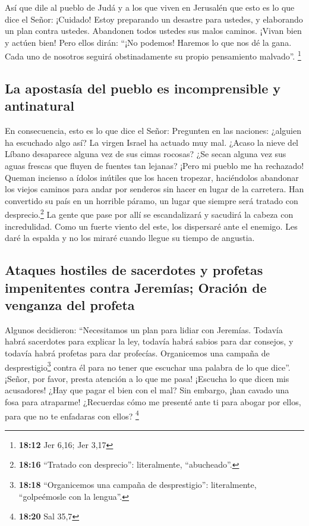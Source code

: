  Así que dile al pueblo de Judá y a los que viven en
Jerusalén que esto es lo que dice el Señor: ¡Cuidado! Estoy preparando
un desastre para ustedes, y elaborando un plan contra ustedes. Abandonen
todos ustedes sus malos caminos. ¡Vivan bien y actúen bien!
 Pero ellos dirán: ``¡No podemos! Haremos lo que nos dé
la gana. Cada uno de nosotros seguirá obstinadamente su propio
pensamiento malvado''. \footnote{\textbf{18:12} Jer 6,16; Jer 3,17}

\hypertarget{la-apostasuxeda-del-pueblo-es-incomprensible-y-antinatural}{%
\subsection{La apostasía del pueblo es incomprensible y
antinatural}\label{la-apostasuxeda-del-pueblo-es-incomprensible-y-antinatural}}

 En consecuencia, esto es lo que dice el Señor: Pregunten
en las naciones: ¿alguien ha escuchado algo así? La virgen Israel ha
actuado muy mal.  ¿Acaso la nieve del Líbano desaparece
alguna vez de sus cimas rocosas? ¿Se secan alguna vez sus aguas frescas
que fluyen de fuentes tan lejanas?  ¡Pero mi pueblo me ha
rechazado! Queman incienso a ídolos inútiles que los hacen tropezar,
haciéndolos abandonar los viejos caminos para andar por senderos sin
hacer en lugar de la carretera.  Han convertido su país
en un horrible páramo, un lugar que siempre será tratado con
desprecio.\footnote{\textbf{18:16} ``Tratado con desprecio'':
  literalmente, ``abucheado''.} La gente que pase por allí se
escandalizará y sacudirá la cabeza con incredulidad. 
Como un fuerte viento del este, los dispersaré ante el enemigo. Les daré
la espalda y no los miraré cuando llegue su tiempo de angustia.

\hypertarget{ataques-hostiles-de-sacerdotes-y-profetas-impenitentes-contra-jeremuxedas-oraciuxf3n-de-venganza-del-profeta}{%
\subsection{Ataques hostiles de sacerdotes y profetas impenitentes
contra Jeremías; Oración de venganza del
profeta}\label{ataques-hostiles-de-sacerdotes-y-profetas-impenitentes-contra-jeremuxedas-oraciuxf3n-de-venganza-del-profeta}}

 Algunos decidieron: ``Necesitamos un plan para lidiar
con Jeremías. Todavía habrá sacerdotes para explicar la ley, todavía
habrá sabios para dar consejos, y todavía habrá profetas para dar
profecías. Organicemos una campaña de desprestigio\footnote{\textbf{18:18}
  ``Organicemos una campaña de desprestigio'': literalmente,
  ``golpeémosle con la lengua''.} contra él para no tener que escuchar
una palabra de lo que dice''.  ¡Señor, por favor, presta
atención a lo que me pasa! ¡Escucha lo que dicen mis acusadores!
 ¿Hay que pagar el bien con el mal? Sin embargo, ¡han
cavado una fosa para atraparme! ¿Recuerdas cómo me presenté ante ti para
abogar por ellos, para que no te enfadaras con ellos? \footnote{\textbf{18:20}
  Sal 35,7}


